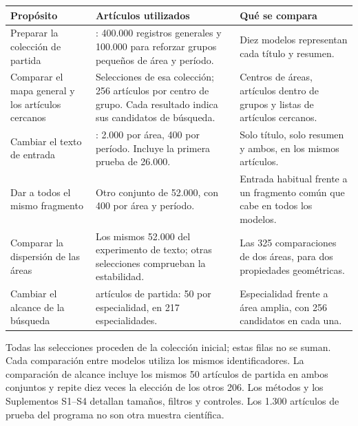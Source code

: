 \par\noindent\begin{minipage}{\linewidth}
\small
\setlength{\tabcolsep}{4pt}
\renewcommand{\arraystretch}{1.10}
\label{tab:T01}
\begin{tabular}{@{}>{\raggedright\arraybackslash}p{4.25cm}>{\raggedright\arraybackslash}p{6.1cm}>{\raggedright\arraybackslash}p{4.8cm}@{}}
\toprule
\textbf{Propósito} & \textbf{Artículos utilizados} & \textbf{Qué se compara} \\
\midrule
Preparar la colección de partida & 500.000: 400.000 registros generales y 100.000 para reforzar grupos pequeños de área y período. & Diez modelos representan cada título y resumen. \\
\addlinespace[8pt]
Comparar el mapa general y los artículos cercanos & Selecciones de esa colección; 256 artículos por centro de grupo. Cada resultado indica sus candidatos de búsqueda. & Centros de áreas, artículos dentro de grupos y listas de artículos cercanos. \\
\addlinespace[8pt]
Cambiar el texto de entrada & 52.000: 2.000 por área, 400 por período. Incluye la primera prueba de 26.000. & Solo título, solo resumen y ambos, en los mismos artículos. \\
\addlinespace[8pt]
Dar a todos el mismo fragmento & Otro conjunto de 52.000, con 400 por área y período. & Entrada habitual frente a un fragmento común que cabe en todos los modelos. \\
\addlinespace[8pt]
Comparar la dispersión de las áreas & Los mismos 52.000 del experimento de texto; otras selecciones comprueban la estabilidad. & Las 325 comparaciones de dos áreas, para dos propiedades geométricas. \\
\addlinespace[8pt]
Cambiar el alcance de la búsqueda & 10.850 artículos de partida: 50 por especialidad, en 217 especialidades. & Especialidad frente a área amplia, con 256 candidatos en cada una. \\
\bottomrule
\end{tabular}
\par\smallskip
Todas las selecciones proceden de la colección inicial; estas filas no se suman. Cada comparación entre modelos utiliza los mismos identificadores. La comparación de alcance incluye los mismos 50 artículos de partida en ambos conjuntos y repite diez veces la elección de los otros 206. Los métodos y los Suplementos S1--S4 detallan tamaños, filtros y controles. Los 1.300 artículos de prueba del programa no son otra muestra científica.
\end{minipage}\par
